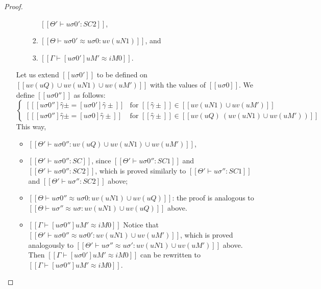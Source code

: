 \begin{proof}
\begin{caseof}
\begin{enumerate}
\begin{itemize}
\begin{enumerate}
                                        $[[Θ' ⊢ uσ0' : SC2]]$,
                                    \item $[[Θ ⊢ uσ0' ≈ uσ0 : uv(uN1)]]$, and 
                                    \item $[[Γ ⊢ [uσ0']uM' ≈ iM0]]$.
                            \end{enumerate}
                    \end{itemize}
                    Let us extend $[[uσ0']]$ to be defined on
                    $[[uv(uQ) ∪ uv(uN1) ∪ uv(uM')]]$
                    with the values of $[[uσ0]]$.
                    We define $[[uσ0'']]$ as follows:
                    $$
                    \begin{cases}
                        [[ [uσ0'']γ̂± = [uσ0']γ̂± ]] & \text{for $[[γ̂±]] \in [[uv(uN1) ∪ uv(uM')]]$}\\
                        [[ [uσ0'']γ̂± = [uσ0]γ̂± ]] & \text{for $[[γ̂±]] \in [[uv(uQ) \ (uv(uN1) ∪ uv(uM'))]]$}
                    \end{cases}
                    $$
                    This way, 
                    \begin{itemize}
                        \item $[[Θ' ⊢ uσ0'' : uv(uQ) ∪ uv(uN1) ∪ uv(uM')]]$,
                        \item $[[Θ' ⊢ uσ0'' : SC]]$,
                            since $[[Θ' ⊢ uσ0'' : SC1]]$ and $[[Θ' ⊢ uσ0'' : SC2]]$,
                            which is proved similarly to
                            $[[Θ' ⊢ uσ'' : SC1]]$ and $[[Θ' ⊢ uσ'' : SC2]]$ above;
                        \item $[[Θ ⊢ uσ0'' ≈ uσ0 : uv(uN1) ∪ uv(uQ)]]$:
                            the proof is analogous to
                            $[[Θ ⊢ uσ'' ≈ uσ : uv(uN1) ∪ uv(uQ)]]$ above.
                        \item $[[Γ ⊢ [uσ0'']uM' ≈ iM0]]$
                            Notice that $[[Θ' ⊢ uσ0'' ≈ uσ0' : uv(uN1) ∪ uv(uM')]]$,
                            which is proved analogously to
                            $[[Θ' ⊢ uσ'' ≈ uσ' : uv(uN1) ∪ uv(uM')]]$ above.
                            Then $[[Γ ⊢ [uσ0']uM' ≈ iM0]]$
                            can be rewritten to $[[Γ ⊢ [uσ0'']uM' ≈ iM0]]$.
                    \end{itemize}
            \end{enumerate}
            



\end{caseof}
\end{proof}
